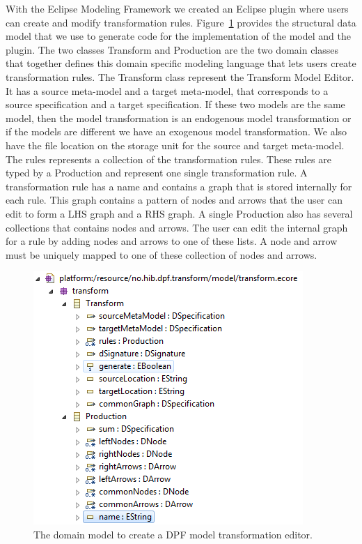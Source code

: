 With the Eclipse Modeling Framework we created an Eclipse plugin where users can
create and modify transformation rules. Figure~\ref{fig:transform_metamodel}
provides the structural data model that we use to generate code for the
implementation of the model and the plugin. The two classes Transform and
Production are the two domain classes that together defines this domain specific
modeling language that lets users create transformation rules. The Transform
class represent the Transform Model Editor. It has a source meta-model and a
target meta-model, that corresponds to a source specification and a target
specification. If these two models are the same model, then the model
transformation is an endogenous model transformation or if the models are
different we have an exogenous model transformation. We also have the file
location on the storage unit for the source and target meta-model. The rules
represents a collection of the transformation rules. These rules are typed by a
Production and represent one single transformation rule. A transformation
rule has a name and contains a graph that is stored internally for each rule.
This graph contains a pattern of nodes and arrows that the user can edit to
form a LHS graph and a RHS graph. A single Production also has several
collections that contains nodes and arrows. The user can edit the internal graph
for a rule by adding nodes and arrows to one of these lists. A node and arrow
must be uniquely mapped to one of these collection of nodes and arrows. 

\begin{figure}[H]
	\centering
	\includegraphics[scale=0.8]{./Figures/transform_metamodel.png}
	\caption[Model for the DPF transformation editor]
	{The domain model to create a DPF model transformation editor.}
	\label{fig:transform_metamodel}
\end{figure}

